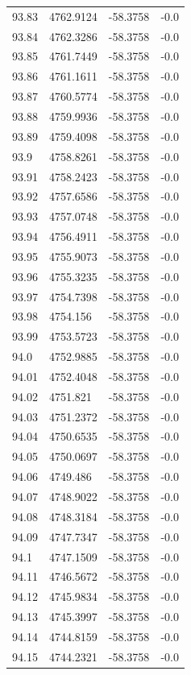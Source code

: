 \begin{table}[H]
\begin{tabular}{llll}
93.83 & 4762.9124 & -58.3758 & -0.0 \\
93.84 & 4762.3286 & -58.3758 & -0.0 \\
93.85 & 4761.7449 & -58.3758 & -0.0 \\
93.86 & 4761.1611 & -58.3758 & -0.0 \\
93.87 & 4760.5774 & -58.3758 & -0.0 \\
93.88 & 4759.9936 & -58.3758 & -0.0 \\
93.89 & 4759.4098 & -58.3758 & -0.0 \\
93.9 & 4758.8261 & -58.3758 & -0.0 \\
93.91 & 4758.2423 & -58.3758 & -0.0 \\
93.92 & 4757.6586 & -58.3758 & -0.0 \\
93.93 & 4757.0748 & -58.3758 & -0.0 \\
93.94 & 4756.4911 & -58.3758 & -0.0 \\
93.95 & 4755.9073 & -58.3758 & -0.0 \\
93.96 & 4755.3235 & -58.3758 & -0.0 \\
93.97 & 4754.7398 & -58.3758 & -0.0 \\
93.98 & 4754.156 & -58.3758 & -0.0 \\
93.99 & 4753.5723 & -58.3758 & -0.0 \\
94.0 & 4752.9885 & -58.3758 & -0.0 \\
94.01 & 4752.4048 & -58.3758 & -0.0 \\
94.02 & 4751.821 & -58.3758 & -0.0 \\
94.03 & 4751.2372 & -58.3758 & -0.0 \\
94.04 & 4750.6535 & -58.3758 & -0.0 \\
94.05 & 4750.0697 & -58.3758 & -0.0 \\
94.06 & 4749.486 & -58.3758 & -0.0 \\
94.07 & 4748.9022 & -58.3758 & -0.0 \\
94.08 & 4748.3184 & -58.3758 & -0.0 \\
94.09 & 4747.7347 & -58.3758 & -0.0 \\
94.1 & 4747.1509 & -58.3758 & -0.0 \\
94.11 & 4746.5672 & -58.3758 & -0.0 \\
94.12 & 4745.9834 & -58.3758 & -0.0 \\
94.13 & 4745.3997 & -58.3758 & -0.0 \\
94.14 & 4744.8159 & -58.3758 & -0.0 \\
94.15 & 4744.2321 & -58.3758 & -0.0 \\

\end{tabular}
\end{table}
